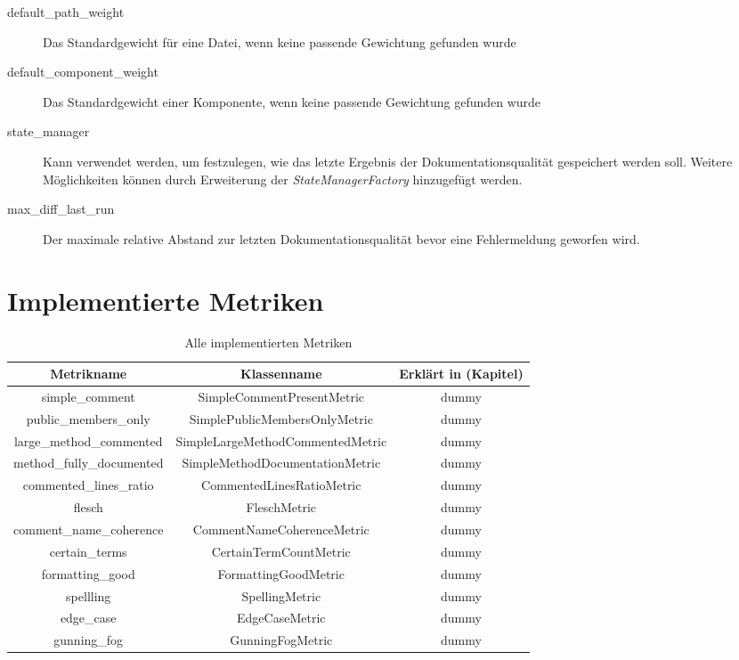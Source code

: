 \begin{appendices}
\begin{description}
         \item[default\_path\_weight] Das Standardgewicht für eine Datei, wenn keine passende Gewichtung gefunden wurde
         
         \item[default\_component\_weight] Das Standardgewicht einer Komponente, wenn keine passende Gewichtung gefunden wurde
         
         \item[state\_manager] Kann verwendet werden, um festzulegen, wie das letzte Ergebnis der Dokumentationsqualität gespeichert werden soll. Weitere Möglichkeiten können durch Erweiterung der \textit{StateManagerFactory} hinzugefügt werden.
         
         \item[max\_diff\_last\_run] Der maximale  relative Abstand zur letzten Dokumentationsqualität bevor eine Fehlermeldung geworfen wird.
        
        
        
    \label{enum:tool_javadoc_conf}
\end{description}
\chapter{Implementierte Metriken}
\begin{table}[h!]
    \centering
    \begin{tabular}{c|c|c}
        \textbf{Metrikname} & \textbf{Klassenname} & \textbf{Erklärt in (Kapitel)}  \\\hline
          simple\_comment & SimpleCommentPresentMetric & dummy\\\hline
        public\_members\_only & SimplePublicMembersOnlyMetric &  dummy\\\hline
        large\_method\_commented & SimpleLargeMethodCommentedMetric & dummy\\\hline
     method\_fully\_documented & SimpleMethodDocumentationMetric & dummy\\\hline
       commented\_lines\_ratio& CommentedLinesRatioMetric & dummy\\\hline
       flesch& FleschMetric & dummy\\\hline
        comment\_name\_coherence&CommentNameCoherenceMetric & dummy\\\hline
     certain\_terms&CertainTermCountMetric & dummy\\\hline
          formatting\_good&FormattingGoodMetric & dummy\\\hline
          spellling&SpellingMetric & dummy\\\hline
        edge\_case&EdgeCaseMetric & dummy\\\hline
        gunning\_fog&GunningFogMetric & dummy\\
    \end{tabular}
    \caption{Alle implementierten Metriken}
    \label{table:metrics_name}
\end{table}

\end{appendices}
	
